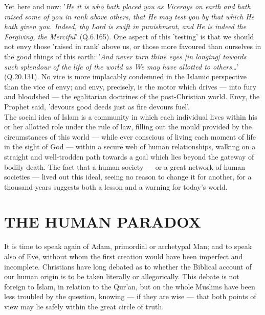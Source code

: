 \documentclass[10pt, twoside,openright]{book}
\begin{document}
Yet here and now: '\emph{He it is who hath placed you as Viceroys on earth and hath raised some of you in 
rank above others, that He may test you by that which He hath given you. Indeed, thy Lord is swift in 
punishment, and He is indeed the Forgiving, the Merciful}' (Q.6.165). One aspect of this 'testing' is 
that we should not envy those 'raised in rank' above us, or those more favoured than ourselves in the 
good things of this earth: '\emph{And never turn thine eyes [in longing] towards such splendour of the life 
of the world as We may have allotted to others\ldots{}}' (Q.20.131). No vice is more implacably condemned 
in the Islamic perspective than the vice of envy; and envy, precisely, is the motor which drives --- 
into fury and bloodshed --- the egalitarian doctrines of the post\hyp{}Christian world. Envy, the Prophet 
said, 'devours good deeds just as fire devours fuel'. \\

The social idea of Islam is a community in which each individual lives within his or her allotted 
role under the rule of law, filling out the mould provided by the circumstances of this world --- while 
ever conscious of living each moment of life in the sight of God --- within a secure web of human 
relationships, walking on a straight and well\hyp{}trodden path towards a goal which lies beyond the 
gateway of bodily death. The fact that a human society --- or a great network of human societies --- 
lived out this ideal, seeing no reason to change it for another, for a thousand years suggests both a 
lesson and a warning for today's world. \\


\chapter{THE HUMAN PARADOX}

It is time to speak again of Adam, primordial or archetypal Man; and to speak also of Eve, without 
whom the first creation would have been imperfect and incomplete. Christians have long debated as to 
whether the Biblical account of our human origin is to be taken literally or allegorically. This 
debate is not foreign to Islam, in relation to the Qur'an, but on the whole Muslims have been less 
troubled by the question, knowing --- if they are wise --- that both points of view may lie safely within 
the great circle of truth. \\
\end{document}
